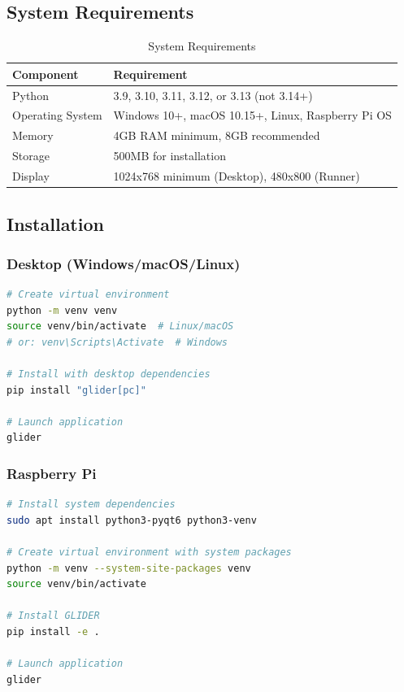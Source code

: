 \documentclass[11pt,a4paper]{article}
\begin{document}
\subsection{System Requirements}

\begin{table}[H]
\centering
\begin{tabular}{@{}ll@{}}
\toprule
\textbf{Component} & \textbf{Requirement} \\
\midrule
Python & 3.9, 3.10, 3.11, 3.12, or 3.13 (not 3.14+) \\
Operating System & Windows 10+, macOS 10.15+, Linux, Raspberry Pi OS \\
Memory & 4GB RAM minimum, 8GB recommended \\
Storage & 500MB for installation \\
Display & 1024x768 minimum (Desktop), 480x800 (Runner) \\
\bottomrule
\end{tabular}
\caption{System Requirements}
\end{table}

\subsection{Installation}

\subsubsection{Desktop (Windows/macOS/Linux)}

\begin{lstlisting}[language=bash]
# Create virtual environment
python -m venv venv
source venv/bin/activate  # Linux/macOS
# or: venv\Scripts\Activate  # Windows

# Install with desktop dependencies
pip install "glider[pc]"

# Launch application
glider
\end{lstlisting}

\subsubsection{Raspberry Pi}

\begin{lstlisting}[language=bash]
# Install system dependencies
sudo apt install python3-pyqt6 python3-venv

# Create virtual environment with system packages
python -m venv --system-site-packages venv
source venv/bin/activate

# Install GLIDER
pip install -e .

# Launch application
glider
\end{lstlisting}
\end{document}

